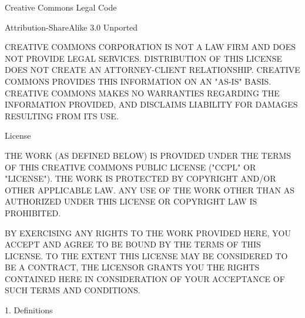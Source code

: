 Creative Commons Legal Code

Attribution-ShareAlike 3.0 Unported

    CREATIVE COMMONS CORPORATION IS NOT A LAW FIRM AND DOES NOT PROVIDE
    LEGAL SERVICES. DISTRIBUTION OF THIS LICENSE DOES NOT CREATE AN
    ATTORNEY-CLIENT RELATIONSHIP. CREATIVE COMMONS PROVIDES THIS
    INFORMATION ON AN "AS-IS" BASIS. CREATIVE COMMONS MAKES NO WARRANTIES
    REGARDING THE INFORMATION PROVIDED, AND DISCLAIMS LIABILITY FOR
    DAMAGES RESULTING FROM ITS USE.

License

THE WORK (AS DEFINED BELOW) IS PROVIDED UNDER THE TERMS OF THIS CREATIVE
COMMONS PUBLIC LICENSE ("CCPL" OR "LICENSE"). THE WORK IS PROTECTED BY
COPYRIGHT AND/OR OTHER APPLICABLE LAW. ANY USE OF THE WORK OTHER THAN AS
AUTHORIZED UNDER THIS LICENSE OR COPYRIGHT LAW IS PROHIBITED.

BY EXERCISING ANY RIGHTS TO THE WORK PROVIDED HERE, YOU ACCEPT AND AGREE
TO BE BOUND BY THE TERMS OF THIS LICENSE. TO THE EXTENT THIS LICENSE MAY
BE CONSIDERED TO BE A CONTRACT, THE LICENSOR GRANTS YOU THE RIGHTS
CONTAINED HERE IN CONSIDERATION OF YOUR ACCEPTANCE OF SUCH TERMS AND
CONDITIONS.

1. Definitions

